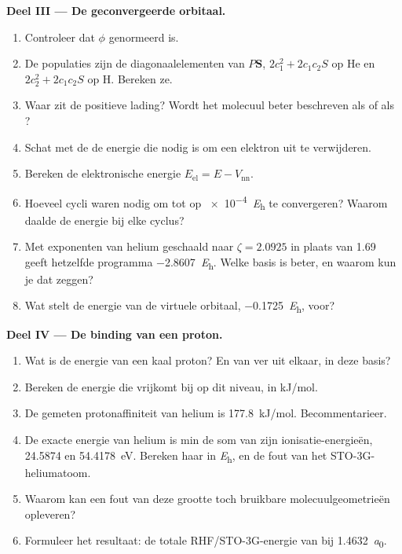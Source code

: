 \begin{problem}
\medskip\noindent\textbf{Deel III --- De geconvergeerde orbitaal.}
\begin{enumerate}[resume]
  \item Controleer dat $\phi$ genormeerd is.
  \item De populaties zijn de diagonaalelementen van $P\mathbf S$, $2c_1^2 + 2c_1c_2S$
        op He en $2c_2^2 + 2c_1c_2S$ op H. Bereken ze.
  \item Waar zit de positieve lading? Wordt het molecuul beter beschreven
        als  of als ?
  \item Schat met de  de energie die nodig is om een
        elektron uit  te verwijderen.
  \item Bereken de elektronische energie $E_{\mathrm{el}} = E - V_{\mathrm{nn}}$.
  \item Hoeveel cycli waren nodig om tot op \qty{e-4}{\hartree} te
        convergeren? Waarom daalde de energie bij elke cyclus?
  \item Met exponenten van helium geschaald naar $\zeta = 2.0925$ in plaats
        van 1.69 geeft hetzelfde programma \qty{-2.8607}{\hartree}. Welke
        basis is beter, en waarom kun je dat zeggen?
  \item Wat stelt de energie van de virtuele orbitaal, \qty{-0.1725}{\hartree}, voor?
\end{enumerate}

\medskip\noindent\textbf{Deel IV --- De binding van een proton.}
\begin{enumerate}[resume]
  \item Wat is de energie van een kaal proton? En van  ver uit
        elkaar, in deze basis?
  \item Bereken de energie die vrijkomt bij  op dit
        niveau, in \unit{kJ/mol}.
  \item De gemeten protonaffiniteit van helium is \qty{177.8}{kJ/mol}.
        Becommentarieer.
  \item De exacte energie van helium is min de som van zijn
        ionisatie-energieën, 24.5874 en \qty{54.4178}{eV}. Bereken haar in
        \unit{\hartree}, en de fout van het STO-3G-heliumatoom.
  \item Waarom kan een fout van deze grootte toch bruikbare
        molecuulgeometrieën opleveren?
  \item Formuleer het resultaat: de totale RHF/STO-3G-energie van  bij
        \qty{1.4632}{\bohr}.
\end{enumerate}
\end{problem}

